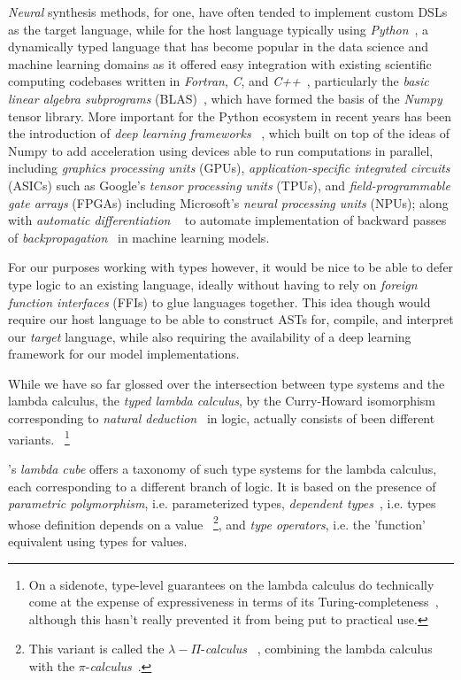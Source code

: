 \documentclass{article}
\begin{document}
\emph{Neural} synthesis methods, for one,
have often tended to implement custom DSLs as the target language,
while for the host language typically using \emph{Python}~\citep{rossum1995python},
a dynamically typed language that has become popular in the
data science and machine learning domains as it offered
easy integration with existing scientific computing codebases
written in \emph{Fortran}, \emph{C}, and \emph{C++}~\citep{mckinney2012python},
particularly the \emph{basic linear algebra subprograms} (BLAS)~\citep{lawson1979basic},
which have formed the basis of the \emph{Numpy}~\citep{oliphant2006guide} tensor library.
More important for the Python ecosystem in recent years has
been the introduction of \emph{deep learning frameworks}%
~\citep{pytorch,abadi2016tensorflow,jax2018github},
which built on top of the ideas of Numpy
to add acceleration using devices able to run computations in parallel,
including \emph{graphics processing units} (GPUs),
\emph{application-specific integrated circuits} (ASICs) such as Google's \emph{tensor processing units} (TPUs),
and \emph{field-programmable gate arrays} (FPGAs)
including Microsoft's \emph{neural processing units} (NPUs);
along with \emph{automatic differentiation}%
~\citep{neidinger2010introduction,baydin2017automatic}
to automate implementation of backward passes of
\emph{backpropagation}~\citep{backproprnn}
in machine learning models.

For our purposes working with types however,
it would be nice to be able to defer type logic to an existing language,
ideally without having to rely on
\emph{foreign function interfaces} (FFIs)
to glue languages together.
This idea though would require our host language
to be able to construct ASTs for, compile,
and interpret our \emph{target} language,
while also requiring the availability of a
deep learning framework for our model implementations.

While we have so far glossed over the intersection
between type systems and the lambda calculus,
the \emph{typed lambda calculus},
by the Curry-Howard isomorphism~\citep{howard1980formulae} corresponding to
\emph{natural deduction}~\citep{gentzen1935untersuchungen} in logic,
actually consists of been different variants.%
~\footnote{
    On a sidenote, type-level guarantees on the lambda calculus do technically
    come at the expense of expressiveness in terms of its
    Turing-completeness~\citep{draheim2017semantics},
    although this hasn't really prevented it from being put to practical use.
}

\citet{barendregt_1991}'s \emph{lambda cube} offers a
taxonomy of such type systems for the lambda calculus,
each corresponding to a different branch of logic.
It is based on the presence of
\emph{parametric polymorphism}, i.e. parameterized types,
\emph{dependent types}~\citep{martin1984intuitionistic},
i.e. types whose definition depends on a value%
~\footnote{
    This variant is called the $\lambda-\Pi$-\emph{calculus}%
    ~\citep{pym1991proof,milner1992functions,boudol1998pi},
    combining the lambda calculus with the $\pi$-\emph{calculus}~\citep{engberg1986calculus}.
},
and \emph{type operators},
i.e. the 'function' equivalent using types for values.
\end{document}
